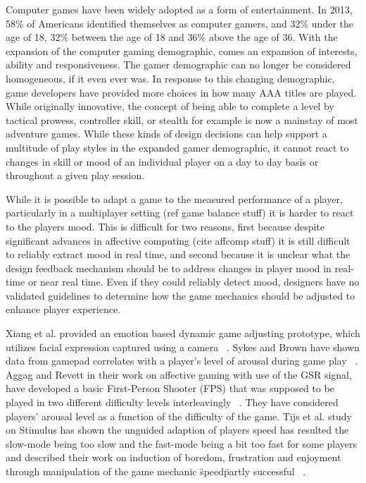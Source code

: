 \documentclass[conference]{IEEEtran}
\begin{document}
Computer games have been widely adopted as a form of entertainment. In 2013, 58\% of Americans identified themselves as computer gamers, and 32\% under the age of 18, 32\% between the age of 18 and 36\% above the age of 36. With the expansion of the computer gaming demographic, comes an expansion of interests, ability and responsiveness. The gamer demographic can no longer be considered homogeneous, if it even ever was. In response to this changing demographic, game developers have provided more choices in how many AAA titles are played. While originally innovative, the concept of being able to complete a level by tactical prowess, controller skill, or stealth for example is now a mainstay of most adventure games. While these kinds of design decisions can help support a multitude of play styles in the expanded gamer demographic, it cannot react to changes in skill or mood of an individual player on a day to day basis or throughout a given play session.

While it is possible to adapt a game to the measured performance of a player, particularly in a multiplayer setting (ref game balance stuff) it is harder to react to the players mood. This is difficult for two reasons, first because despite significant advances in affective computing (cite affcomp stuff) it is still difficult to reliably extract mood in real time, and second because it is unclear what the design feedback mechanism should be to address changes in player mood in real-time or near real time. Even if they could reliably detect mood, designers have no validated guidelines to determine how the game mechanics should be adjusted to enhance player experience.

Xiang et al. provided an emotion based dynamic game adjusting prototype, which utilizes facial expression captured using a camera ~\cite{xiang2013dynamic}. Sykes and Brown have shown data from gamepad correlates with a player's level of arousal during game play  ~\cite{sykes2003affective}. Aggag and Revett in their work on affective gaming with use of the GSR signal, have developed a basic First-Person Shooter (FPS) that was supposed to be played in two different difficulty levels interleavingly ~\cite{aggag2011affective}. They have considered players' arousal level as a function of the difficulty of the game. Tijs et al. study on Stimulus has shown the unguided adaption of players speed has resulted the slow-mode being too slow and the fast-mode being a bit too fast for some players and described their work on induction of boredom, frustration and enjoyment through manipulation of the game mechanic \"speed\" partly successful ~\cite{tijs2009creating}. 
\end{document}
